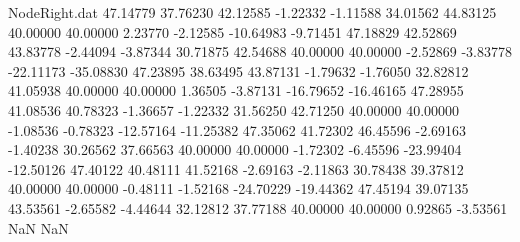 \begin{filecontents}{NodeRight.dat}
  47.14779   37.76230   42.12585    -1.22332   -1.11588   34.01562   44.83125   40.00000   40.00000    2.23770   -2.12585  -10.64983   -9.71451
  47.18829   42.52869   43.83778    -2.44094   -3.87344   30.71875   42.54688   40.00000   40.00000   -2.52869   -3.83778  -22.11173  -35.08830
  47.23895   38.63495   43.87131    -1.79632   -1.76050   32.82812   41.05938   40.00000   40.00000    1.36505   -3.87131  -16.79652  -16.46165
  47.28955   41.08536   40.78323    -1.36657   -1.22332   31.56250   42.71250   40.00000   40.00000   -1.08536   -0.78323  -12.57164  -11.25382
  47.35062   41.72302   46.45596    -2.69163   -1.40238   30.26562   37.66563   40.00000   40.00000   -1.72302   -6.45596  -23.99404  -12.50126
  47.40122   40.48111   41.52168    -2.69163   -2.11863   30.78438   39.37812   40.00000   40.00000   -0.48111   -1.52168  -24.70229  -19.44362
  47.45194   39.07135   43.53561    -2.65582   -4.44644   32.12812   37.77188   40.00000   40.00000    0.92865   -3.53561        NaN        NaN
\end{filecontents}
